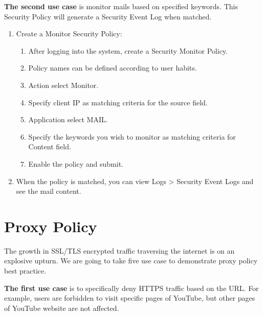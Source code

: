 \textbf{The second use case} is monitor mails based on specified keywords. This Security Policy will generate a Security Event Log when matched.

\begin{description}[leftmargin=0pt,itemindent=0em]
    \item[] 
    \begin{enumerate}
        \item	Create a Monitor Security Policy:
        \begin{enumerate}
            \item	After logging into the system, create a Security Monitor Policy.
            \item	Policy names can be defined according to user habits.
            \item	Action select Monitor.
            \item	Specify client IP as matching criteria for the source field. 
            \item	Application select MAIL.
            \item	Specify the keywords you wish to monitor as matching criteria for Content field.  
            \item	Enable the policy and submit.
        \end{enumerate}        
        \item	When the policy is matched, you can view Logs > Security Event Logs and see the mail content.
    \end{enumerate}	
\end{description}

\section*{\hypertarget{link:Appendix Proxy Policy}{Proxy Policy}}
\label{sec:appendix_f:proxy}

The growth in SSL/TLS encrypted traffic traversing the internet is on an explosive upturn. We are going to take five use case to demonstrate proxy policy best practice. 


\textbf{The first use case} is to specifically deny HTTPS traffic based on the URL. For example, users are forbidden to visit specific pages of YouTube, but other pages of YouTube website are not affected.

